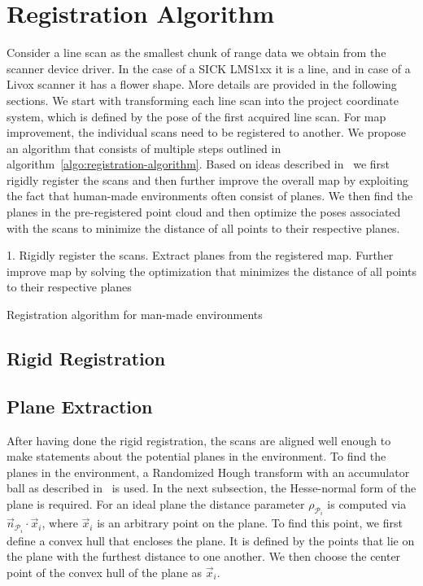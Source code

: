 \section{Registration Algorithm}

Consider a line scan as the smallest chunk of range data we obtain from the scanner device driver.
In the case of a SICK LMS1xx it is a line, and in case of a Livox scanner it has a flower shape.
More details are provided in the following sections.
We start with transforming each line scan into the project coordinate system, which is defined by the pose of the first acquired line scan.
%
For map improvement, the individual scans need to be registered to another. 
We propose an algorithm that consists of multiple steps outlined in algorithm~\ref{algo:registration-algorithm}. 
Based on ideas described in~\cite{Borrmann2010} we first rigidly register the scans and then further improve the overall map by exploiting the fact that human-made environments often consist of planes. 
We then find the planes in the pre-registered point cloud and then optimize the poses associated with the scans to minimize the distance of all points to their respective planes. 

\begin{algorithm}
    \SetAlgoLined
    1. Rigidly register the scans. Extract planes from the registered map. Further improve map by solving the optimization that minimizes the distance of all points to their respective planes\;
    \caption{Registration algorithm for man-made environments}
    \label{algo:registration-algorithm}
\end{algorithm}

\subsection{Rigid Registration}


\subsection{Plane Extraction}

After having done the rigid registration, the scans are aligned well enough to make statements about the potential planes in the environment.
To find the planes in the environment, a Randomized Hough transform with an accumulator ball as described in~\cite{3DRESEARCH2011} is used. 
In the next subsection, the Hesse-normal form of the plane is required.
For an ideal plane the distance parameter $\rho_{\mathcal{P}_i}$ is computed via $\vec{n}_{\mathcal{P}_i}\cdot\vec{x}_i$, where $\vec{x}_i$ is an arbitrary point on the plane.
To find this point, we first define a convex hull that encloses the plane.
It is defined by the points that lie on the plane with the furthest distance to one another.
We then choose the center point of the convex hull of the plane as $\vec{x}_i$.

